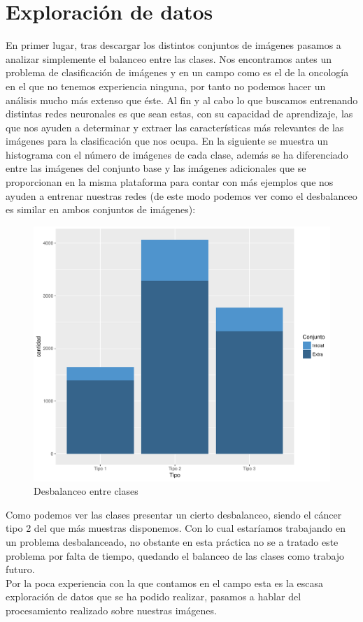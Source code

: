 \section{Exploración de datos}

En primer lugar, tras descargar los distintos conjuntos de imágenes pasamos a analizar simplemente el balanceo entre las clases. Nos encontramos antes un problema de clasificación de imágenes y en un campo como es el de la oncología en el que no tenemos experiencia ninguna, por tanto no podemos hacer un análisis mucho más extenso que éste. Al fin y al cabo lo que buscamos entrenando distintas redes neuronales es que sean estas, con su capacidad de aprendizaje, las que nos ayuden a determinar y extraer las características más relevantes de las imágenes para la clasificación que nos ocupa. En la siguiente se muestra un histograma con el número de imágenes de cada clase, además se ha diferenciado entre las imágenes del conjunto base y las imágenes adicionales que se proporcionan en la misma plataforma para contar con más ejemplos que nos ayuden a entrenar nuestras redes (de este modo podemos ver como el desbalanceo es similar en ambos conjuntos de imágenes):\\

\begin{figure}[H]
  \centering
  \includegraphics[scale=0.5]{img/conteo.pdf}
  \caption{Desbalanceo entre clases}
\end{figure}

Como podemos ver las clases presentar un cierto desbalanceo, siendo el cáncer tipo 2 del que más muestras disponemos. Con lo cual estaríamos trabajando en un problema desbalanceado, no obstante en esta práctica no se a tratado este problema por falta de tiempo, quedando el balanceo de las clases como trabajo futuro.\\
 
Por la poca experiencia con la que contamos en el campo esta es la escasa exploración de datos que se ha podido realizar, pasamos a hablar del procesamiento realizado sobre nuestras imágenes.
